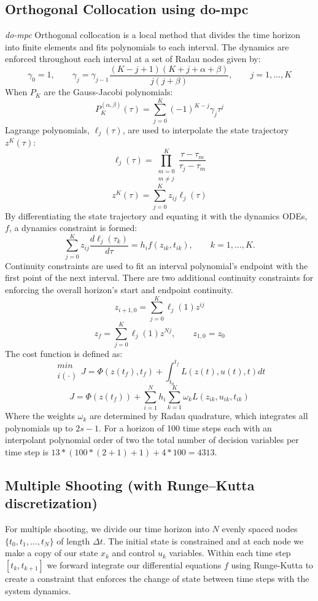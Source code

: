 \documentclass[]{article}
\begin{document}
\subsection*{Orthogonal Collocation using {do-mpc}} 
{\em do-mpc} \cite{doi:10.1137/1.9780898719383}  Orthogonal collocation is a local method that divides the time horizon into finite elements and fits polynomials to each interval. The dynamics are enforced throughout each interval at a set of Radau nodes given by:
        \[
        \gamma_0=1,  \qquad \gamma_j = \gamma_{j-1} \frac{(K-j+1)(K+j+\alpha+\beta)}{j(j+\beta)}, \qquad j = 1,\ldots,K
        \]
When $P_K$ are the Gauss-Jacobi polynomials:
        \[
        P_K^{(\alpha, \beta)}(\tau) = \sum_{j=0}^{K}(-1)^{K-j}\gamma_j\tau^j
        \]
Lagrange polynomials, $\ell_j(\tau)$, are used to interpolate the state trajectory $z^K(\tau)$:
        \[
	\ell_j(\tau)=\prod_{\substack{m=0 \\ m\neq j}}^{K}\frac{\tau-\tau_m}{\tau_j-\tau_m}
        \]        
        \[
	z^K(\tau)=\sum_{j=0}^{K}z_{ij}\ell_j(\tau)
        \]
By differentiating the state trajectory and equating it with the dynamics ODEs, $f$, a dynamics constraint is formed:
        \[
        \sum_{j=0}^K z_{ij}\frac{d\ell_j(\tau_k)}{d\tau}=h_if(z_{ik},t_{ik}), 
        \qquad k=1,\dots,K.
        \]
Continuity constraints are used to fit an interval polynomial's endpoint with the first point of the next interval. There are two additional continuity constraints for enforcing the overall horizon's start and endpoint continuity.
        \[
	z_{i+1,0}=\sum_{j=0}^{K}\ell_j(1)z^{ij}
        \]
        \[
	z_f=\sum_{j=0}^{K}\ell_j(1)z^{Nj}, \qquad z_{1,0} = z_0
        \]
        The cost function is defined as:
        \[
        	\substack{min \\ i(\cdot)}J=\Phi(z(t_f),t_f) + \int_{t_0}^{t_f}L(z(t),u(t),t)dt
        \]
        \[
        J=\Phi(z(t_f)) + \sum_{i=1}^{N}h_i\sum_{k=1}^{K}\omega_kL(z_{ik},u_{ik},t_{ik})
        \]
Where the weights $\omega_k$ are determined by Radau quadrature, which integrates all polynomials up to $2s-1$. For a horizon of 100 time steps each with an interpolant polynomial order of two the total number of decision variables per time step is $13*(100*(2+1)+1)+4*100=4313.$

\subsection*{Multiple Shooting (with Runge–Kutta discretization)}
For multiple shooting, we divide our time horizon into $N$ evenly spaced nodes $\{ t_0, t_1, \ldots, t_N \}$ of length $\Delta t$. The initial state is constrained and at each node we make a copy of our state $x_k$ and control $u_k$ variables. Within each time step $[ t_k, t_{k+1}]$ we forward integrate our differential equations $f$ using Runge-Kutta to create a constraint that enforces the change of state between time steps with the system dynamics. 
\end{document}
